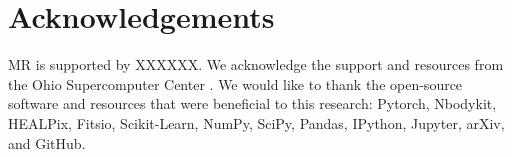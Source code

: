 \section*{Acknowledgements}
MR is supported by XXXXXX. We acknowledge the support and resources from the Ohio Supercomputer Center \citep[OSC;][]{OhioSupercomputerCenter1987}. We would like to thank the open-source software and resources that were beneficial to this research: Pytorch, Nbodykit, HEALPix, Fitsio, Scikit-Learn, NumPy, SciPy, Pandas, IPython, Jupyter, arXiv, and GitHub. 

